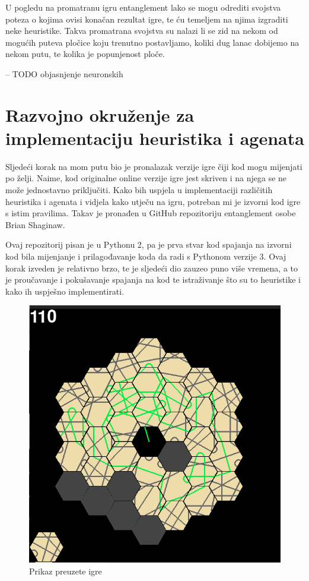 \documentclass[zavrsnirad]{fer}
\begin{document}
U pogledu na promatranu igru entanglement lako se mogu odrediti svojstva poteza o kojima ovisi konačan rezultat igre, te ću temeljem na njima izgraditi neke heuristike. Takva promatrana svojstva su nalazi li se zid na nekom od mogućih puteva pločice koju trenutno postavljamo, koliki dug lanac dobijemo na nekom putu, te kolika je popunjenost ploče. 


-- TODO objasnjenje neuronskih



\section{Razvojno okruženje za implementaciju heuristika i agenata}
\label{pog:razvojno_okruzenje}


Sljedeći korak na mom putu bio je pronalazak verzije igre čiji kod mogu mijenjati po želji. Naime, kod originalne online verzije igre jest skriven i na njega se ne može jednostavno priključiti. Kako bih uspjela u implementaciji različitih heuristika i agenata i vidjela kako utječu na igru, potreban mi je izvorni kod igre s istim pravilima. Takav je pronađen u GitHub repozitoriju \cite{entanglementgithub} entanglement osobe Brian Shaginaw.

Ovaj repozitorij pisan je u Pythonu 2, pa je prva stvar kod spajanja na izvorni kod bila mijenjanje i prilagođavanje koda da radi s Pythonom verzije 3. Ovaj korak izveden je relativno brzo, te je sljedeći dio zauzeo puno više vremena, a to je proučavanje i pokušavanje spajanja na kod te istraživanje što su to heuristike i kako ih uspješno implementirati. 

\begin{figure}[htb]
	\centering
	\includegraphics[width=0.58\linewidth]{Figures/gamefinished.png} 
	\caption{Prikaz preuzete igre}
	\label{slk:game_finished}
\end{figure}
\end{document}
